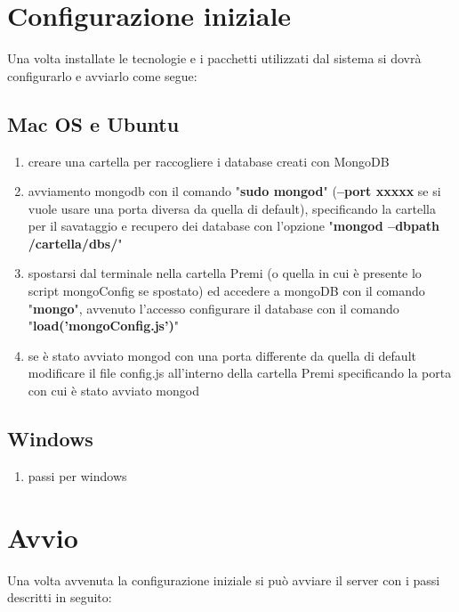 \section{Configurazione iniziale}
Una volta installate le tecnologie e i pacchetti utilizzati dal sistema si dovr\`{a} configurarlo e avviarlo come segue:

\subsection{Mac OS e Ubuntu}

\begin{enumerate}

\item creare una cartella per raccogliere i database creati con MongoDB
\item avviamento mongodb con il comando "\textbf{sudo mongod}" (\textbf{--port xxxxx} se si vuole usare una porta diversa da quella di default), specificando la cartella per il savataggio e recupero dei database con l'opzione "\textbf{mongod --dbpath /cartella/dbs/}"
\item  spostarsi dal terminale nella cartella Premi (o quella in cui \`{e} presente lo script mongoConfig se spostato) ed accedere a mongoDB con il comando "\textbf{mongo}", avvenuto l'accesso configurare il database con il comando "\textbf{load('mongoConfig.js')}"
\item se \`{e} stato avviato mongod con una porta differente da quella di default modificare il file config.js all'interno della cartella Premi specificando la porta con cui \`{e} stato avviato mongod

\end{enumerate}


\subsection{Windows}
\begin{enumerate}

\item passi per windows

\end{enumerate}

\newpage

\section{Avvio}
Una volta avvenuta la configurazione iniziale si pu\`{o} avviare il server con i passi descritti in seguito:

